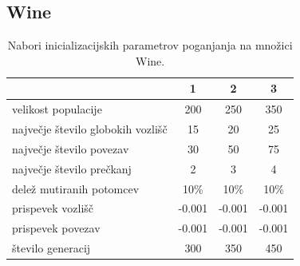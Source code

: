 \subsection{Wine}\label{subsec:wine_test}
\begin{table}[H]
    \caption{Nabori inicializacijskih parametrov poganjanja na množici Wine.}
    \begin{center}
        \begin{tabular}{||l c c c||}
            \hline
            & 1      & 2      & 3 \\ [0.5ex]
            \hline
            velikost populacije               & 200    & 250    & 350    \\
            \hline
            največje število globokih vozlišč & 15     & 20     & 25     \\
            \hline
            največje število povezav          & 30     & 50     & 75     \\
            \hline
            največje število prečkanj         & 2      & 3      & 4      \\
            \hline
            delež mutiranih potomcev          & 10\%   & 10\%   & 10\%   \\
            \hline
            prispevek vozlišč                 & -0.001 & -0.001 & -0.001 \\
            \hline
            prispevek povezav                 & -0.001 & -0.001 & -0.001 \\
            \hline
            število generacij                 & 300    & 350    & 450    \\
            \hline
        \end{tabular}
    \end{center}
    \label{tab:param_wine}
\end{table}

